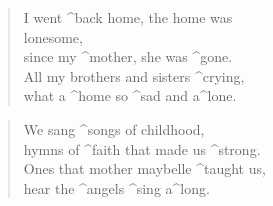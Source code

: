 \documentclass{leadsheet}
\begin{document}
\begin{song}
\begin{multicols}{2}
    \begin{chorus}[after-label=]\end{chorus}

    \begin{verse}
      I went ^back home, the home was \\ lonesome, \\
      since my ^mother, she was ^gone. \\
      All my brothers and sisters ^crying, \\
      what a ^home so ^sad and a^lone. \\
    \end{verse}
  
    \begin{chorus}[after-label=]\end{chorus}

    \begin{verse}
      We sang ^songs of childhood, \\
      hymns of ^faith that made us ^strong. \\
      Ones that mother maybelle ^taught us, \\
      hear the ^angels ^sing a^long. \\
    \end{verse}
  
    \begin{chorus}[after-label=]\end{chorus}

  \end{multicols}
\end{song}
\end{document}
